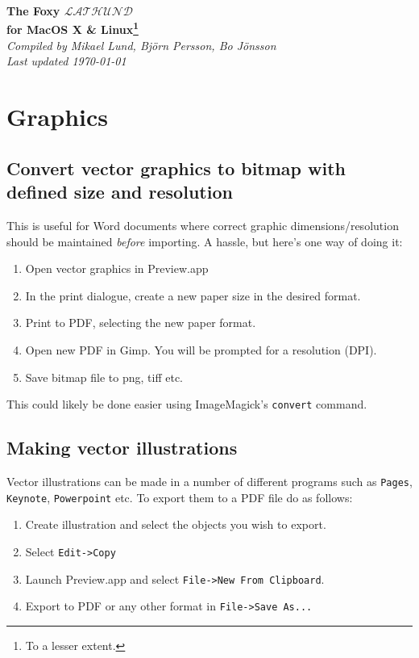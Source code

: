 \documentclass[a4paper,10pt]{article}
\begin{document}
\renewcommand{\thefootnote}{\fnsymbol{footnote}}%

\begin{center}
\Huge
\textbf{The Foxy $\mathcal{LATHUND}$\\ for MacOS X \& Linux\footnote[2]{To a lesser extent.}}\\
\normalsize
\vspace{0.5cm}
\emph{Compiled by Mikael Lund, Bj\"orn Persson, Bo J\"onsson\\
Last updated \today}
\end{center}

\tableofcontents



\section{Graphics}
\subsection{Convert vector graphics to bitmap with defined size and resolution}
This is useful for Word documents where correct graphic dimensions/resolution should be maintained \emph{before} importing. A hassle, but here's one way of doing it:
\begin{enumerate}
\item Open vector graphics in Preview.app
\item In the print dialogue, create a new paper size in the desired format.
\item Print to PDF, selecting the new paper format.
\item Open new PDF in Gimp. You will be prompted for a resolution (DPI).
\item Save bitmap file to png, tiff etc.
\end{enumerate}
This could likely be done easier using ImageMagick's \verb"convert" command.

\subsection{Making vector illustrations}
Vector illustrations can be made in a number of different programs such as
\verb+Pages+, \verb+Keynote+, \verb+Powerpoint+ etc. To export them to a PDF file do as follows:
\begin{enumerate}
\item Create illustration and select the objects you wish to export.
\item Select \verb+Edit->Copy+
\item Launch Preview.app and select \verb+File->New From Clipboard+.
\item Export to PDF or any other format in \verb+File->Save As...+
\end{enumerate}
\end{document}
